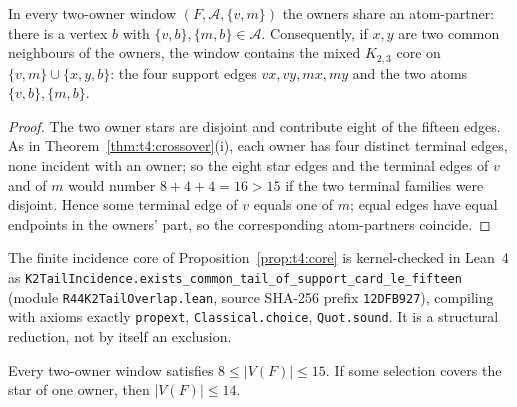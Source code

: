 \begin{proposition}\label{prop:t4:core}
In every two-owner window \((F,\mathcal A,\{v,m\})\) the owners share
an atom-partner: there is a vertex \(b\) with
\(\{v,b\},\{m,b\}\in\mathcal A\). Consequently, if \(x,y\) are two
common neighbours of the owners, the window contains the mixed
\(K_{2,3}\) core on \(\{v,m\}\cup\{x,y,b\}\): the four support edges
\(vx,vy,mx,my\) and the two atoms \(\{v,b\},\{m,b\}\).
\end{proposition}

\begin{proof}
The two owner stars are disjoint and contribute eight of the fifteen
edges. As in Theorem~\ref{thm:t4:crossover}(i), each owner has four
distinct terminal edges, none incident with an owner; so the eight star
edges and the terminal edges of \(v\) and of \(m\) would number
\(8+4+4=16>15\) if the two terminal families were disjoint. Hence some
terminal edge of \(v\) equals one of \(m\); equal edges have equal
endpoints in the owners' part, so the corresponding atom-partners
coincide.
\end{proof}

The finite incidence core of Proposition~\ref{prop:t4:core} is
kernel-checked in Lean~4 as
\texttt{K2TailIncidence.exists\_common\_tail\_of\_support\_card\_le\_fifteen}
(module \texttt{R44K2TailOverlap.lean}, source SHA-256 prefix
\texttt{12DFB927}), compiling with axioms exactly \texttt{propext},
\texttt{Classical.choice}, \texttt{Quot.sound}. It is a structural
reduction, not by itself an exclusion.

\begin{lemma}\label{lem:t4:vertexrange}
Every two-owner window satisfies \(8\le|V(F)|\le15\). If some
selection covers the star of one owner, then \(|V(F)|\le14\).
\end{lemma}

